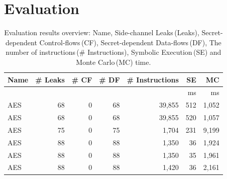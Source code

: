 \section{Evaluation}
\label{res_overview}

\begin{table}[]
    \centering\small\footnotesize
    \caption{Evaluation results overview: Name, Side-channel Leaks\,(Leaks), 
        Secret-dependent Control-flows\,(CF), Secret-dependent Data-flows\,(DF),
        The number of instructions\,(\# Instructions), Symbolic Execution\,(SE) and Monte Carlo\,(MC) time.
    }\label{table:over_result}
    \vspace*{-5pt}
    \newlength{\x}
    \newlength{\y}
    \settowidth{\x}{~~}
    \settowidth{\y}{m}
    \addtolength{\x}{-1\y}
    \newcommand{\foo}{\mbox{\hspace*{\the\x}}}
    \begin{threeparttable}
    \begin{tabular}{l@{}r@{~~}rrr@{~~}rr}
        \hline
        \textbf{Name}   & \textbf{\# Leaks} & \textbf{\# CF}         & \textbf{\# DF}
                           & \textbf{\# Instructions}    & \textbf{SE} & \textbf{MC}                                                    \\\hline
                                                 &                        &                     &                      &              & ms        & ms              \\\cline{6-7}
        AES\tnote{1}               & 68                     & 0                   & 68                   & 39,855        & 512     & 1,052         \\
        AES\tnote{2}                & 68                     & 0                   & 68                   & 39,855       & 520    & 1,057         \\
        AES\tnote{4}                & 75                     & 0                   & 75                   & 1,704        & 231    & 9,199        \\
        AES\tnote{5}                & 88                     & 0                   & 88                   & 1,350        & 36      & 1,924         \\
        AES\tnote{6}                & 88                     & 0                   & 88                   & 1,350        & 35      & 1,961        \\
        AES\tnote{7}                & 88                     & 0                   & 88                   & 1,420        & 36     & 2,161        \\

\end{tabular}
\end{threeparttable}
\end{table}

